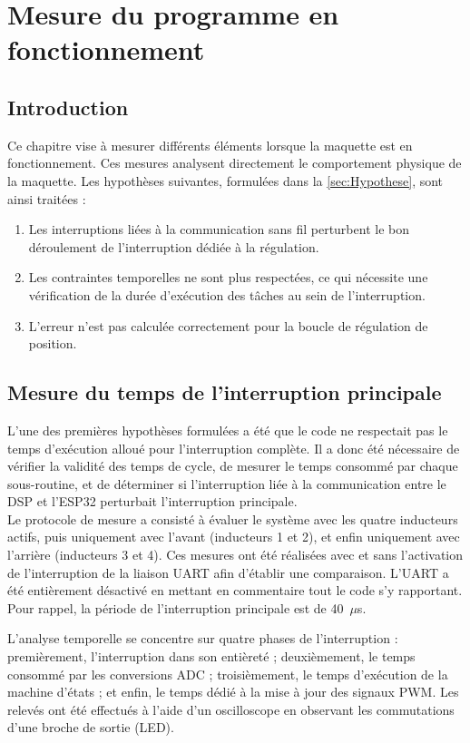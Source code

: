 \chapter{Mesure du programme en fonctionnement}

\section{Introduction}
Ce chapitre vise à mesurer différents éléments lorsque la maquette est en fonctionnement. Ces mesures analysent directement le comportement physique de la maquette. Les hypothèses suivantes, formulées dans la \autoref{sec:Hypothese}, sont ainsi traitées :

\begin{enumerate}
    \item Les interruptions liées à la communication sans fil perturbent le bon déroulement de l'interruption dédiée à la régulation.
    \item Les contraintes temporelles ne sont plus respectées, ce qui nécessite une vérification de la durée d'exécution des tâches au sein de l'interruption.
    \item L'erreur n'est pas calculée correctement pour la boucle de régulation de position.
\end{enumerate}

\section{Mesure du temps de l'interruption principale}
L'une des premières hypothèses formulées a été que le code ne respectait pas le temps d'exécution alloué pour l'interruption complète. Il a donc été nécessaire de vérifier la validité des temps de cycle, de mesurer le temps consommé par chaque sous-routine, et de déterminer si l'interruption liée à la communication entre le DSP et l'ESP32 perturbait l'interruption principale.\\

Le protocole de mesure a consisté à évaluer le système avec les quatre inducteurs actifs, puis uniquement avec l'avant (inducteurs 1 et 2), et enfin uniquement avec l'arrière (inducteurs 3 et 4). Ces mesures ont été réalisées avec et sans l'activation de l'interruption de la liaison UART afin d'établir une comparaison. L'UART a été entièrement désactivé en mettant en commentaire tout le code s'y rapportant. Pour rappel, la période de l'interruption principale est de 40~$\mu$s.

L'analyse temporelle se concentre sur quatre phases de l'interruption : premièrement, l'interruption dans son entièreté ; deuxièmement, le temps consommé par les conversions ADC ; troisièmement, le temps d'exécution de la machine d'états ; et enfin, le temps dédié à la mise à jour des signaux PWM. Les relevés ont été effectués à l'aide d'un oscilloscope en observant les commutations d'une broche de sortie (LED).\\


